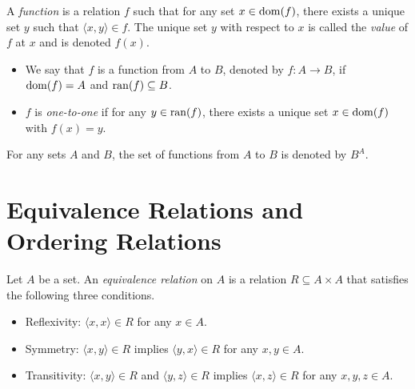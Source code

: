 \begin{definition}
  A \emph{function} is a relation $f$ such that for any set $x \in \operatorname{dom}(f)$,
  there exists a unique set $y$ such that $\langle x, y \rangle \in f$.
  The unique set $y$ with respect to $x$ is called the \emph{value} of $f$
  at $x$ and is denoted $f(x)$.
  \begin{itemize}
    \item We say that $f$ is a function from $A$ to $B$, denoted by
    $f: A \to B$, if $\operatorname{dom}(f) = A$ and $\operatorname{ran}(f) \subseteq B$.
    \item $f$ is \emph{one-to-one} if for any $y \in \operatorname{ran}(f)$, there exists a
    unique set $x \in \operatorname{dom}(f)$ with $f(x) = y$.
  \end{itemize}
\end{definition}

\begin{definition}
  For any sets $A$ and $B$, the set of functions from $A$ to $B$ is denoted by
  $B^A$.
\end{definition}

\section{Equivalence Relations and Ordering Relations}
\begin{definition}
  Let $A$ be a set.
  An \emph{equivalence relation} on $A$ is a relation $R \subseteq A \times A$
  that satisfies the following three conditions.
  \begin{itemize}
    \item Reflexivity: $\langle x, x \rangle \in R$ for any $x \in A$.
    \item Symmetry: $\langle x, y \rangle \in R$ implies
    $\langle y, x \rangle \in R$ for any $x, y \in A$.
    \item Transitivity: $\langle x, y \rangle \in R$ and
    $\langle y, z \rangle \in R$ implies $\langle x, z \rangle \in R$ for any
    $x, y, z \in A$.
  \end{itemize}
\end{definition}
